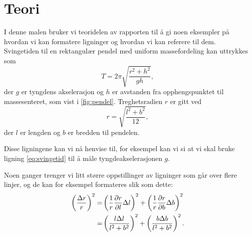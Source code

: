 \section{Teori}
I denne malen bruker vi teoridelen av rapporten til å gi noen eksempler på hvordan vi kan formatere ligninger og hvordan vi kan referere til dem. Svingetiden til en rektangulær pendel med uniform massefordeling kan uttrykkes som 
\begin{equation}
T=2\pi\sqrt{\frac{r^2+h^2}{gh}},
\label{eq:svingetid} %
\end{equation}
der $g$ er tyngdens akselerasjon og $h$ er avstanden fra opphengspunktet til massesenteret, som vist i \autoref{fig:pendel}. Treghetsradien $r$ er gitt ved
\begin{equation}
r=\sqrt{\frac{l^2+b^2}{12}},
\label{eq:treghetsradius}
\end{equation}
der $l$ er lengden og $b$ er bredden til pendelen.


Disse ligningene kan vi nå henvise til, for eksempel kan vi si at vi skal bruke ligning
\eqref{eq:svingetid} til å måle tyngdeakselerasjonen $g$.


Noen ganger trenger vi litt større oppstillinger av ligninger som går over flere linjer, og de kan for eksempel formateres slik som dette:
\begin{align}
\left(\frac{\Delta r}{r}\right)^2=&\left(\frac{1}{r}\frac{\partial r}{\partial l}\Delta l\right)^2+\left(\frac{1}{r}\frac{\partial r}{\partial b}\Delta b\right)^2 \notag \\
=&\left(\frac{l\Delta l}{l^2+b^2}\right)^2+\left(\frac{b\Delta b}{l^2+b^2}\right)^2.
\label{eq:feilforplantning}
\end{align}

